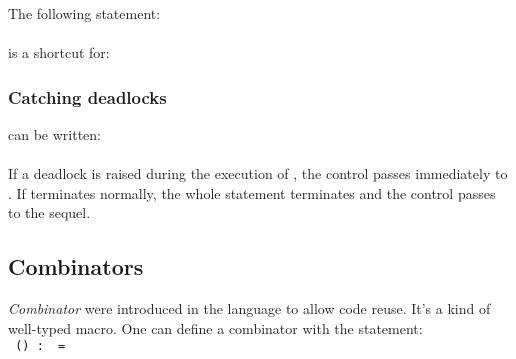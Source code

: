 The following statement:\\
     \\
is a shortcut for:
  
     

\subsubsection{Catching deadlocks}
\label{try}

       


can be written:\\


   \\

If  a deadlock  is  raised  during the  execution  of ,  the
control  passes  immediately to  .  If   terminates
normally, the  whole statement terminates  and the control  passes to
the sequel.


\subsection{Combinators}
\label{combinators}


 {\em  Combinator} were  introduced  in the  language  to allow  code
 reuse. It's a kind of  well-typed macro. One can define a combinator
 with the  statement:\\

{\tt  {}    ()  :~  =  
   }\\


